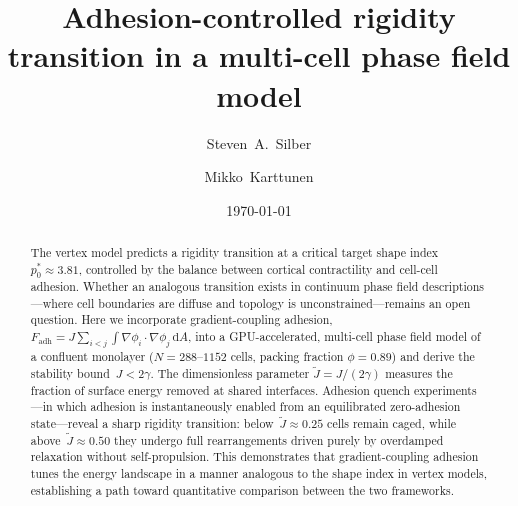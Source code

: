 \documentclass[aps,pre,twocolumn,superscriptaddress,longbibliography]{revtex4-2}
\newcommand{\dd}{\mathrm{d}}               %
\newcommand{\Jk}{\tilde{J}}                %
\newcommand{\phii}{\phi_i}                 %
\newcommand{\phij}{\phi_j}                 %
\begin{document}
\title{Adhesion-controlled rigidity transition in a multi-cell phase field model}

\author{Steven~A.~Silber}

\author{Mikko~Karttunen}

\date{\today}

\begin{abstract}
The vertex model predicts a rigidity transition at a critical target shape index
$p_0^*\!\approx 3.81$, controlled by the balance between cortical contractility
and cell-cell adhesion.  Whether an analogous transition exists in continuum
phase field descriptions---where cell boundaries are diffuse and topology is
unconstrained---remains an open question.  Here we incorporate gradient-coupling
adhesion,
$F_{\mathrm{adh}} = J\sum_{i<j}\!\int\!\nabla\phii\cdot\nabla\phij\,\dd A$,
into a GPU-accelerated, multi-cell phase field model of a confluent monolayer
($N = 288$--$1152$ cells, packing fraction $\phi = 0.89$) and derive the
stability bound~$J < 2\gamma$.  The dimensionless parameter
$\Jk = J/(2\gamma)$ measures the fraction of surface energy removed at shared
interfaces.  Adhesion quench experiments---in which adhesion is instantaneously
enabled from an equilibrated zero-adhesion state---reveal a sharp rigidity
transition: below~$\Jk \approx 0.25$ cells remain caged, while
above~$\Jk \approx 0.50$ they undergo full rearrangements driven purely by
overdamped relaxation without self-propulsion.  This demonstrates that
gradient-coupling adhesion tunes the energy landscape in a manner analogous to
the shape index in vertex models, establishing a path toward quantitative
comparison between the two frameworks.
\end{abstract}

\maketitle
\end{document}
